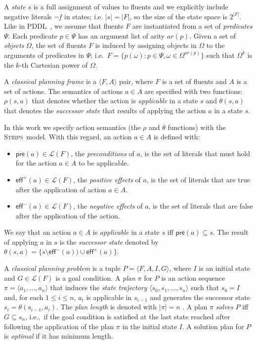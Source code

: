 \documentclass[letterpaper]{article} %
\newcommand{\tup}[1]{{\langle #1 \rangle}}
\newcommand{\pre}{\mathsf{pre}}     %
\newcommand{\eff}{\mathsf{eff}}     %
\newcommand{\strips}{\textsc{Strips}}     %
\begin{document}
A {\em state} $s$ is a full assignment of values to fluents and we explicitly include negative literals $\neg f$ in states; i.e. $|s|=|F|$, so the size of the state space is $2^{|F|}$. Like in PDDL~\cite{fox2003pddl2}, we assume that fluents $F$ are instantiated from a set of {\em predicates} $\Psi$. Each predicate $p\in\Psi$ has an argument list of arity $ar(p)$. Given a set of {\em objects} $\Omega$, the set of fluents $F$ is induced by assigning objects in $\Omega$ to the arguments of predicates in $\Psi$; i.e.~$F=\{p(\omega):p\in\Psi,\omega\in\Omega^{ar(p)}\}$ such that $\Omega^k$ is the $k$-th Cartesian power of $\Omega$.

A {\em classical planning frame} is a $\tup{F,A}$ pair, where $F$ is a set of fluents and $A$ is a set of actions. The semantics of actions $a\in A$ are specified with two functions: $\rho(s,a)$ that denotes whether the action is {\em applicable} in a state $s$ and $\theta(s,a)$ that denotes the {\em successor state} that results of applying the action $a$ in a state $s$.

In this work we specify action semantics (the $\rho$ and $\theta$ functions) with the \strips\ model. With this regard, an action $a\in A$ is defined with:
\begin{itemize}
\item $\pre(a)\in\mathcal{L}(F)$, the {\em preconditions} of $a$, is the set of literals that must hold for the action $a\in A$ to be applicable.
\item $\eff^+(a)\in\mathcal{L}(F)$, the {\em positive effects} of $a$, is the set of literals that are true after the application of action $a\in A$.
\item $\eff^-(a)\in\mathcal{L}(F)$, the {\em negative effects} of $a$, is the set of literals that are false after the application of the action.
\end{itemize}
We say that an action $a\in A$ is {\em applicable} in a state $s$ iff $\pre(a)\subseteq s$. The result of applying $a$ in $s$ is the {\em successor state} denoted by $\theta(s,a)=\{s\setminus\eff^-(a))\cup\eff^+(a)\}$.

A {\em classical planning problem} is a tuple $P=\tup{F,A,I,G}$, where $I$ is an initial state and $G\in\mathcal{L}(F)$ is a goal condition. A {\em plan} $\pi$ for $P$ is an action sequence $\pi=\tup{a_1, \ldots, a_n}$ that induces the {\em state trajectory} $\tup{s_0, s_1, \ldots, s_n}$ such that $s_0=I$ and, for each {\small $1\leq i\leq n$}, $a_i$ is applicable in $s_{i-1}$ and generates the successor state $s_i=\theta(s_{i-1},a_i)$. The {\em plan length} is denoted with $|\pi|=n$ . A plan $\pi$ {\em solves} $P$ iff $G\subseteq s_n$, i.e.,~if the goal condition is satisfied at the last state reached after following the application of the plan $\pi$ in the initial state $I$. A solution plan for $P$ is {\em optimal} if it has minimum length.
\end{document}
